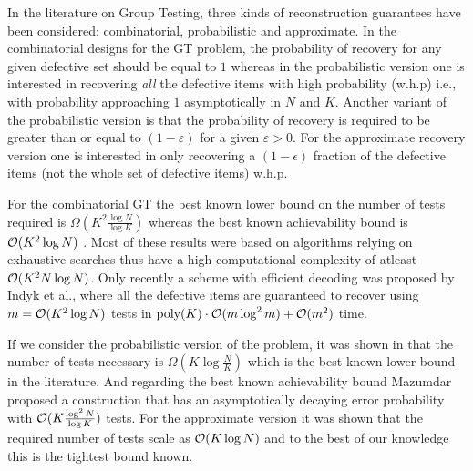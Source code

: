 In the literature on Group Testing, three kinds of reconstruction guarantees have been considered: combinatorial, probabilistic and approximate. In the combinatorial designs for the GT problem, the probability of recovery for any given defective set should be equal to $1$ whereas in the probabilistic version one is interested in recovering \textit{all} the defective items with high probability (w.h.p) i.e., with probability approaching $1$ asymptotically in $N$ and $K$. Another variant of the probabilistic version is that the probability of recovery is required to be  greater than or equal to $(1-\varepsilon)$ for a given $\varepsilon>0$. For the approximate recovery version one is interested in only recovering a $(1-\epsilon)$ fraction of the defective items (not the whole set of defective items) w.h.p.

For the combinatorial GT the best known lower bound on the number of tests required is $\Omega(K^2\frac{\log N}{\log K})$ \cite{d1982bounds,erdos1985families} whereas the best known achievability bound is $\mathcal{O}(K^2 \log N)$ \cite{kautz1964nonrandom,porat2011explicit}. Most of these results were based on algorithms relying on exhaustive searches thus have a high computational complexity of atleast $\mathcal{O}(K^2 N\log N)$. Only recently a scheme with efficient decoding was proposed by Indyk et al., \cite{indyk2010efficiently} where all the defective items are guaranteed to recover using $m=\mathcal{O}(K^2\log N)$ tests in $\text{poly}(K)\cdot \mathcal{O}(m \log^2 m )+\mathcal{O}(m^2)$ time. 

If we consider the probabilistic version of the problem, it was shown in \cite{chan2014non,atia2012boolean} that the number of tests necessary is $\Omega(K\log \frac{N}{K})$ which is the best known lower bound in the literature. And regarding the best known achievability bound Mazumdar \cite{mazumdar2015nonadaptive} proposed a construction that has an asymptotically decaying error probability with $\mathcal{O}(K\frac{\log^2 N}{\log K})$ tests. For the approximate version it was shown \cite{atia2012boolean} that the required number of tests scale as $\mathcal{O}(K\log N)$ and to the best of our knowledge this is the tightest bound known.


